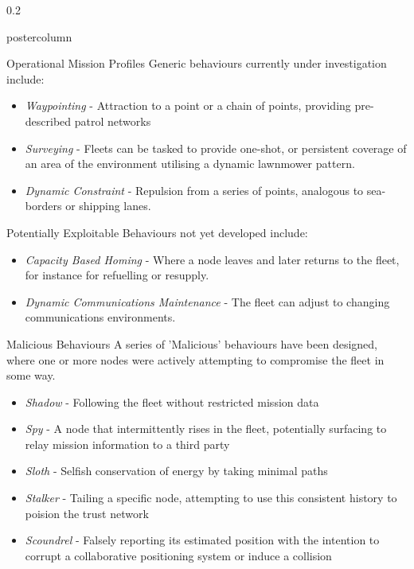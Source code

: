 \documentclass[final,hyperref={pdfpagelabels=false}]{beamer}
\def\colwidth{0.2\linewidth}
\begin{document}
\begin{frame}[fragile]
\begin{columns}[T]
		\begin{column}{\colwidth}
			\begin{beamercolorbox}[center,wd=\textwidth]{postercolumn}
				\begin{minipage}[T]{.98\textwidth} %
					\parbox[t]{\textwidth}{ %
						\begin{block}{Operational Mission Profiles}
							Generic behaviours currently under investigation include:
							\begin{itemize}
								\item \emph{Waypointing} - Attraction to a point or a chain of points, providing pre-described patrol networks
								\item \emph{Surveying} - Fleets can be tasked to provide one-shot, or persistent coverage of an area of the environment utilising a dynamic lawnmower pattern.
								\item \emph{Dynamic Constraint} - Repulsion from a series of points, analogous to sea-borders or shipping lanes.
							\end{itemize}
							
							Potentially Exploitable Behaviours not yet developed include:
							\begin{itemize}
								\item \emph{Capacity Based Homing} - Where a node leaves and later returns to the fleet, for instance for refuelling or resupply.
								\item \emph{Dynamic Communications Maintenance} - The fleet can adjust to changing communications environments.
							\end{itemize}
						\end{block}
						\iffalse
						\begin{block}{Malicious Behaviours}
							A series of 'Malicious' behaviours have been designed, where one or more nodes were actively attempting to compromise the fleet in some way.
							\begin{itemize}
								\item \emph{Shadow} - Following the fleet without restricted mission data
								\item \emph{Spy} - A node that intermittently rises in the fleet, potentially surfacing to relay mission information to a third party
								\item \emph{Sloth} - Selfish conservation of energy by taking minimal paths
								\item \emph{Stalker} - Tailing a specific node, attempting to use this consistent history to poision the trust network
								\item \emph{Scoundrel} - Falsely reporting its estimated position with the intention to corrupt a collaborative positioning system or induce a collision
							\end{itemize}
							

\end{block}}
\end{minipage}
\end{beamercolorbox}
\end{column}
\end{columns}
\end{frame}
\end{document}
